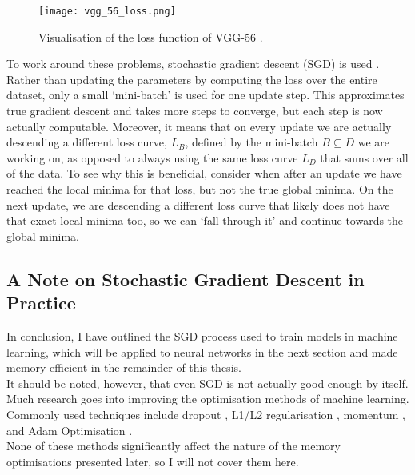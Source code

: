 \begin{figure}[htb]
    \centering
    \texttt{[image: vgg\_56\_loss.png]}
    \caption{Visualisation of the loss function of VGG-56 \cite{Li2018}.}
    \label{fig:2-vgg-loss}
\end{figure}

To work around these problems, stochastic gradient descent (SGD) is used \cite{Bottou2018}. Rather than updating the parameters by computing the loss over the entire dataset, only a small `mini-batch' is used for one update step. This approximates true gradient descent and takes more steps to converge, but each step is now actually computable. Moreover, it means that on every update we are actually descending a different loss curve, \(L_B\), defined by the mini-batch \(B\subseteq D\) we are working on, as opposed to always using the same loss curve \(L_D\) that sums over all of the data. To see why this is beneficial, consider when after an update we have reached the local minima for that loss, but not the true global minima. On the next update, we are descending a different loss curve that likely does not have that exact local minima too, so we can ‘fall through it’ and continue towards the global minima.

\subsection*{A Note on Stochastic Gradient Descent in Practice}
In conclusion, I have outlined the SGD process used to train models in machine learning, which will be applied to neural networks in the next section and made memory-efficient in the remainder of this thesis. \\

It should be noted, however, that even SGD is not actually good enough by itself. Much research goes into improving the optimisation methods of machine learning. Commonly used techniques include dropout \cite{Srivastava2014}, L1/L2 regularisation \cite{Anders1992-weight-decay, Ng2004}, momentum \cite{Sutskever2013}, and Adam Optimisation \cite{Kingma2015-adam}. \\

None of these methods significantly affect the nature of the memory optimisations presented later, so I will not cover them here.

